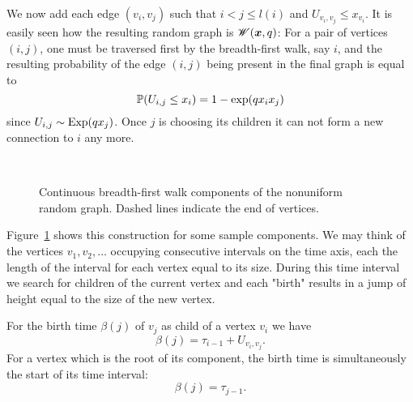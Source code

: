 We now add each edge $(v_i, v_j)$ such that $i < j \leq l(i)$ and $U_{v_i, v_j} \leq x_{v_i}$.
It is easily seen how the resulting random graph is $\mathscr{W}(\boldsymbol{x}, q)$:
For a pair of vertices $(i, j)$, one must be traversed first by the breadth-first walk, say $i$,
and the resulting probability of the edge $(i,j)$ being present in the final graph is equal to
\begin{equation}
	\mathbb{P}(U_{i,j} \leq x_i ) = 1 - \exp(q x_i x_j)
\end{equation}
since $U_{i,j} \sim \operatorname*{Exp}(qx_j)$.
Once $j$ is choosing its children it can not form a new connection to $i$ any more.

\begin{figure}[H]
	\centering
	\\
	
	\centering
	
	\caption{Continuous breadth-first walk components of the nonuniform random graph. Dashed lines indicate the end of vertices.}
	\label{F: nonu bf-walk}
\end{figure} 

Figure~\ref{F: nonu bf-walk} shows this construction for some sample components. 
We may think of the vertices $v_1, v_2, \dots$ occupying consecutive intervals on the time axis,
each the length of the interval for each vertex equal to its size.
During this time interval we search for children of the current vertex 
and each "birth" results in a jump of height equal to the size of the new vertex.

For the birth time $\beta(j)$ of $v_j$ as child of a vertex $v_i$ we have
\begin{equation}
	\beta(j) = \tau_{i-1} + U_{v_i, v_j}.
\end{equation}
For a vertex which is the root of its component, the birth time is simultaneously the start of its time interval:
\begin{equation}
	\beta(j) = \tau_{j-1}.
\end{equation}







